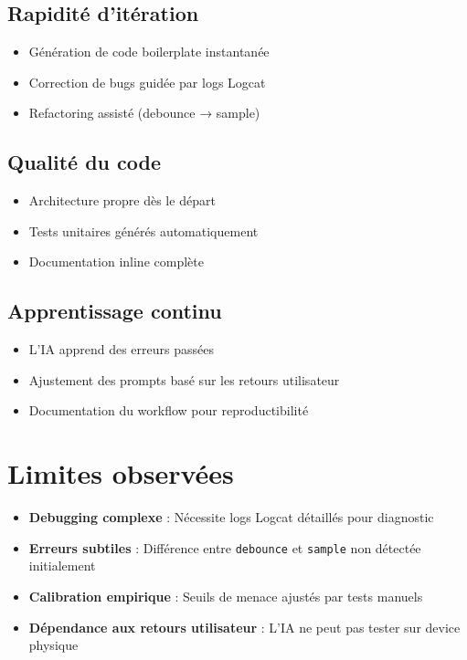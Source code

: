\documentclass[11pt,a4paper]{article}
\begin{document}
\subsection{Rapidité d'itération}
\begin{itemize}
    \item Génération de code boilerplate instantanée
    \item Correction de bugs guidée par logs Logcat
    \item Refactoring assisté (debounce → sample)
\end{itemize}

\subsection{Qualité du code}
\begin{itemize}
    \item Architecture propre dès le départ
    \item Tests unitaires générés automatiquement
    \item Documentation inline complète
\end{itemize}

\subsection{Apprentissage continu}
\begin{itemize}
    \item L'IA apprend des erreurs passées
    \item Ajustement des prompts basé sur les retours utilisateur
    \item Documentation du workflow pour reproductibilité
\end{itemize}

\section{Limites observées}

\begin{itemize}
    \item \textbf{Debugging complexe} : Nécessite logs Logcat détaillés pour diagnostic
    \item \textbf{Erreurs subtiles} : Différence entre \texttt{debounce} et \texttt{sample} non détectée initialement
    \item \textbf{Calibration empirique} : Seuils de menace ajustés par tests manuels
    \item \textbf{Dépendance aux retours utilisateur} : L'IA ne peut pas tester sur device physique
\end{itemize}
\end{document}
